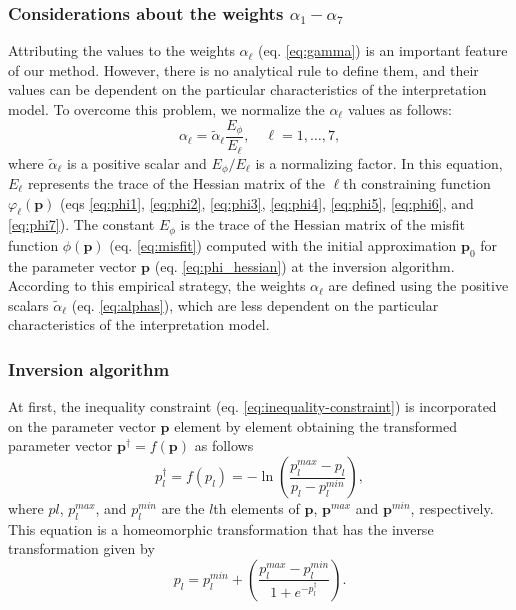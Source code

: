 \subsubsection{Considerations about the weights $\alpha_{1}-\alpha_{7}$}

Attributing the values to the weights $ \alpha_{\ell} $ (eq. \ref{eq:gamma}) is an important feature of our method. However, there is no analytical rule to define them, and their values can be dependent on the particular characteristics of the interpretation model. To overcome this problem, we normalize the $ \alpha_{\ell} $ values as follows:
\begin{equation}\label{eq:alphas}
\alpha_{\ell} = \tilde{\alpha}_\ell\frac{E_\phi}{E_\ell}, \quad \ell = 1,\dots, 7,
\end{equation}
where $\tilde{\alpha}_\ell$ is a positive scalar and $ E_\phi/E_\ell $ is a normalizing factor. In this equation, $ E_\ell $ represents the trace of the Hessian matrix of the $\ell$th constraining function $\varphi_{\ell}(\mathbf{p})$ (eqs \ref{eq:phi1}, \ref{eq:phi2}, \ref{eq:phi3}, \ref{eq:phi4}, \ref{eq:phi5}, \ref{eq:phi6}, and \ref{eq:phi7}). The constant $E_\phi$ is the trace of the Hessian matrix of the misfit function $\phi(\mathbf{p})$ (eq. \ref{eq:misfit}) computed with the initial approximation $ \mathbf{p}_0 $ for the parameter vector $ \mathbf{p} $ (eq. \ref{eq:phi_hessian}) at the inversion algorithm. According to this empirical strategy, the weights $ \alpha_{\ell} $ are defined using the positive scalars $\tilde{\alpha}_\ell$ (eq. \ref{eq:alphas}), which are less dependent on the particular characteristics of the interpretation model.

\subsubsection{Inversion algorithm}

At first, the inequality constraint (eq. \ref{eq:inequality-constraint}) is incorporated on the parameter vector $\mathbf{p}$ element by element obtaining the transformed parameter vector $\mathbf{p}^\dagger = f(\mathbf{p})$ as follows
\begin{equation}\label{eq:inequality-function}
p^\dagger_l = f(p_l) = -\ln\left(\frac{p_l^{max} - p_l}{p_l - p_l^{min}}\right),
\end{equation}
where $pl$, $p_l^{max}$, and $p_l^{min}$ are the $l$th elements of $\mathbf{p}$, $\mathbf{p}^{max}$ and $\mathbf{p}^{min}$, respectively. This equation is a homeomorphic transformation that has the inverse transformation given by
\begin{equation}\label{eq:inv-inequality-function}
p_l = p_l^{min} + \left(\frac{p_l^{max} - p_l^{min}}{ 1 + e^{-p^\dagger_l} }\right).
\end{equation}

